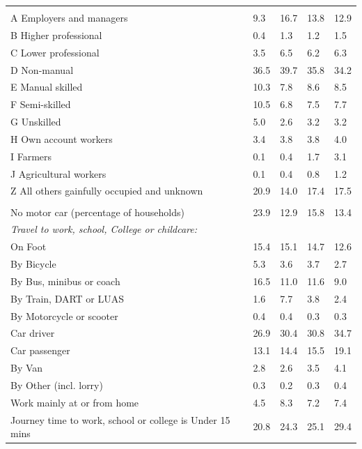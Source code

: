 \documentclass{article}
\begin{document}
\begin{table}[h]
\begin{tabular}{KTTTT}
\hline
    \\ 
    \hline
A Employers and managers &  9.3& 16.7& 13.8& 12.9\\
B Higher professional & 0.4& 1.3& 1.2& 1.5\\
C Lower professional & 3.5& 6.5& 6.2& 6.3\\
D Non-manual & 36.5& 39.7& 35.8& 34.2\\
E Manual skilled & 10.3&  7.8&  8.6&  8.5\\
F Semi-skilled & 10.5&  6.8&  7.5&  7.7\\
G Unskilled & 5.0& 2.6& 3.2& 3.2\\
H Own account workers & 3.4& 3.8& 3.8& 4.0\\
I Farmers & 0.1& 0.4& 1.7& 3.1\\
J Agricultural workers & 0.1& 0.4& 0.8& 1.2\\
Z All others gainfully occupied and unknown & 20.9& 14.0& 17.4& 17.5\\
\hline
{}\hline
    \\ 
    \hline
No motor car (percentage of households) & 23.9& 12.9& 15.8& 
13.4\\
    \hline 
\emph{Travel to work, school, College or childcare:} & & & \\
\quad On Foot & 15.4& 15.1& 14.7& 12.6\\ 
\quad By Bicycle & 5.3& 3.6& 3.7& 2.7\\ 
\quad By Bus, minibus or coach & 16.5& 11.0& 11.6&  9.0\\
\quad By Train, DART or LUAS & 1.6& 7.7& 3.8& 2.4\\
\quad By Motorcycle or scooter & 0.4& 0.4& 0.3& 0.3\\
\quad Car driver & 26.9 & 30.4& 30.8& 34.7\\
\quad Car passenger & 13.1& 14.4& 15.5& 19.1\\
\quad By Van & 2.8& 2.6& 3.5& 4.1\\
\quad By Other (incl. lorry) & 0.3& 0.2& 0.3& 0.4\\
    \hline
Work mainly at or from home & 4.5& 8.3& 7.2& 7.4\\
Journey time to work, school or college is Under 15 mins & 20.8& 24.3& 25.1& 29.4\\

\end{tabular}
\end{table}
\end{document}
